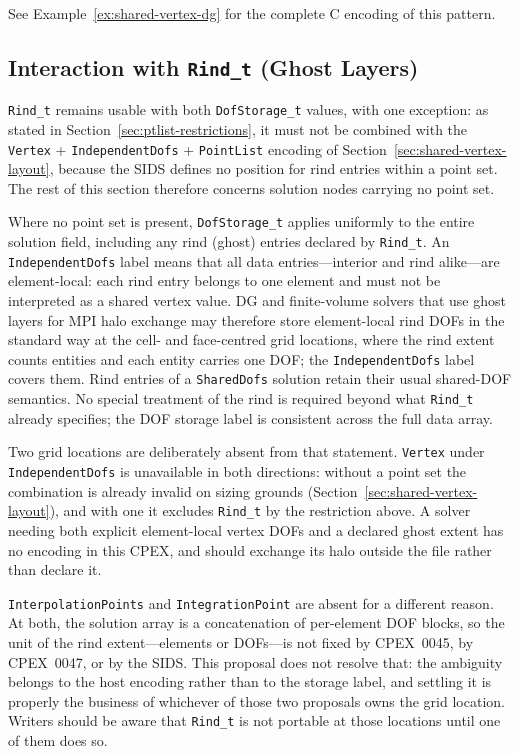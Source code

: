\documentclass[11pt,letterpaper]{article}
\begin{document}
See Example~\ref{ex:shared-vertex-dg} for the complete C encoding
of this pattern.

\subsection{Interaction with \texttt{Rind\_t} (Ghost Layers)}
\label{sec:rind-interaction}

\texttt{Rind\_t} remains usable with both \texttt{DofStorage\_t} values,
with one exception: as stated in
Section~\ref{sec:ptlist-restrictions}, it must not be combined with the
\texttt{Vertex} + \texttt{IndependentDofs} + \texttt{PointList} encoding
of Section~\ref{sec:shared-vertex-layout}, because the SIDS defines no
position for rind entries within a point set.  The rest of this section
therefore concerns solution nodes carrying no point set.

Where no point set is present, \texttt{DofStorage\_t} applies uniformly
to the entire solution field, including any rind (ghost) entries
declared by \texttt{Rind\_t}.  An \texttt{IndependentDofs} label means that
all data entries---interior and rind alike---are element-local: each
rind entry belongs to one element and must not be interpreted as a
shared vertex value.  DG and finite-volume solvers that use ghost layers
for MPI halo exchange may therefore store element-local rind DOFs in the
standard way at the cell- and face-centred grid locations, where the rind
extent counts entities and each entity carries one DOF; the
\texttt{IndependentDofs} label covers them.  Rind
entries of a \texttt{SharedDofs} solution retain their usual
shared-DOF semantics.  No special treatment of the rind is required
beyond what \texttt{Rind\_t} already specifies; the DOF storage label
is consistent across the full data array.

Two grid locations are deliberately absent from that statement.
\texttt{Vertex} under \texttt{IndependentDofs} is unavailable in both
directions: without a point set the combination is already invalid on
sizing grounds (Section~\ref{sec:shared-vertex-layout}), and with one it
excludes \texttt{Rind\_t} by the restriction above.  A solver needing
both explicit element-local vertex DOFs and a declared ghost extent has
no encoding in this CPEX, and should exchange its halo outside the file
rather than declare it.

\texttt{InterpolationPoints} and \texttt{IntegrationPoint} are absent for
a different reason.  At both, the solution array is a concatenation of
per-element DOF blocks, so the unit of the rind extent---elements or
DOFs---is not fixed by CPEX~0045, by CPEX~0047, or by the SIDS.  This
proposal does not resolve that: the ambiguity belongs to the host
encoding rather than to the storage label, and settling it is properly
the business of whichever of those two proposals owns the grid location.
Writers should be aware that \texttt{Rind\_t} is not portable at those
locations until one of them does so.
\end{document}
